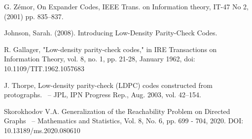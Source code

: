 \documentclass[leqno]{aadmbook}
\begin{document}
\begin{thebibliography}{1}









G. Zémor, On Expander Codes, IEEE Trans. on Information theory, IT-47
No 2, (2001) pp. 835–837.
  
Johnson, Sarah. (2008). Introducing Low-Density Parity-Check Codes. 

R. Gallager, "Low-density parity-check codes," in IRE Transactions on Information Theory, vol. 8, no. 1, pp. 21-28, January 1962, doi: 10.1109/TIT.1962.1057683

J. Thorpe,
Low-density parity-check (LDPC) codes constructed from protographs.
~-- JPL, IPN Progress Rep., Aug. 2003, vol. 42–154.

Skorokhodov V.A. Generalization of the Reachability Problem on Directed Graphs
~-- Mathematics and Statistics, Vol. 8, No. 6, pp. 699 - 704, 2020. DOI: 10.13189/ms.2020.080610


\end{thebibliography}
\end{document}
